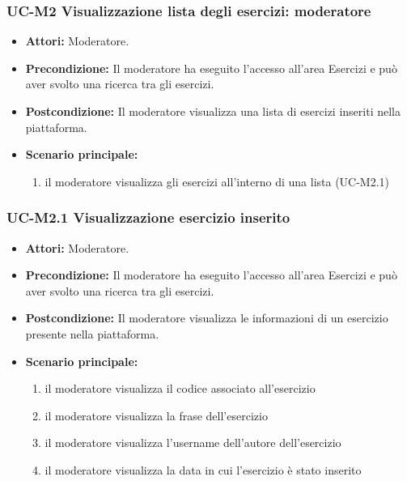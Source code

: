 \subsubsection{UC-M2 Visualizzazione lista degli esercizi: moderatore}
	\begin{itemize}
		\item \textbf{Attori:} Moderatore.
		\item \textbf{Precondizione:} Il moderatore ha eseguito l'accesso all'area Esercizi e può aver svolto una ricerca tra gli esercizi.
		\item \textbf{Postcondizione:} Il moderatore visualizza una lista di esercizi inseriti nella piattaforma.
		\item \textbf{Scenario principale:}
			\begin{enumerate}
				\item il moderatore visualizza gli esercizi all'interno di una lista (UC-M2.1)
			\end{enumerate}
	\end{itemize}
		
\subsubsection{UC-M2.1 Visualizzazione esercizio inserito}
	\begin{itemize}
		\item \textbf{Attori:} Moderatore.
		\item \textbf{Precondizione:} Il moderatore ha eseguito l'accesso all'area Esercizi e può aver svolto una ricerca tra gli esercizi.
		\item \textbf{Postcondizione:} Il moderatore visualizza le informazioni di un esercizio presente nella piattaforma.
		\item \textbf{Scenario principale:}
			\begin{enumerate}
				\item il moderatore visualizza il codice associato all'esercizio
				\item il moderatore visualizza la frase dell'esercizio
				\item il moderatore visualizza l'username dell'autore dell'esercizio
				\item il moderatore visualizza la data in cui l'esercizio è stato inserito
			\end{enumerate}
	\end{itemize}		
		
